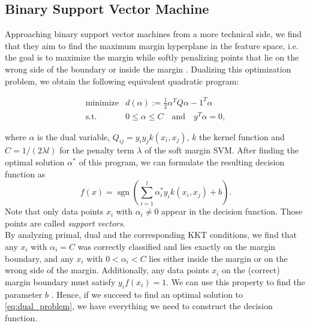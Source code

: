 \subsection{Binary Support Vector Machine}


Approaching binary support vector machines from a more technical side, we find that they aim to find the maximum margin hyperplane in the feature space, i.e. the goal is to maximize the margin while softly penalizing points that lie on the wrong side of the boundary or inside the margin \cite{Bishop2006}. Dualizing this optimization problem, we obtain the following equivalent quadratic program:

\begin{eqnarray}\label{eq:dual_problem}
	\text{minimize} & d(\alpha) := \frac{1}{2} \alpha^T Q \alpha - 1^T \alpha  \\ 
	\nonumber
	\text{s.t.} &  0 \leq \alpha \leq C  \quad \text{and} \quad 	y^T \alpha = 0,
\end{eqnarray}

where $\alpha$ is the dual variable, $Q_{ij} = y_i y_j k(x_i,x_j)$, $k$ the kernel function and $C = 1/(2 \lambda l)$ for the penalty term $\lambda$ of the soft margin SVM.
After finding the optimal solution $\alpha^*$ of this program, we can formulate the resulting decision function as
\begin{equation*}
f(x) = \operatorname{sgn}\left(\sum_{i=1}^{l}\alpha^*_i y_i k(x_i,x_j)+b\right).
\end{equation*}
Note that only data points $x_i$ with $\alpha_i \neq 0$ appear in the decision function. Those points are called \textit{support vectors}.\\
By analyzing primal, dual and the corresponding KKT conditions, we find that any $x_i$ with $\alpha_i = C$ was correctly classified and lies exactly on the margin boundary, and any $x_i$ with $0<\alpha_i < C$ lies either inside the margin or on the wrong side of the margin. Additionally, any data points $x_i$ on the (correct) margin boundary must satisfy $y_i f(x_i) = 1$. We can use this property to find the parameter $b$ \cite{Bishop2006}. Hence, if we succeed to find an optimal solution to \eqref{eq:dual_problem}, we have everything we need to construct the decision function.

